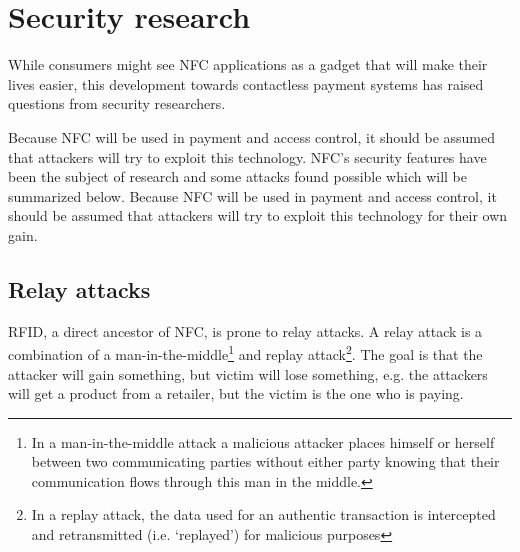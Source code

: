 \section{Security research}
\label{sec:known_vulnerabilities}

While consumers might see NFC applications as a gadget that will make their lives easier, this development towards contactless payment systems has raised questions from security researchers.

Because NFC will be used in payment and access control, it should be assumed that attackers will try to exploit this technology.
NFC's security features have been the subject of research and some attacks found possible which will be summarized below.
Because NFC will be used in payment and access control, it should be assumed that attackers will try to exploit this technology for their own gain. 


\subsection{Relay attacks}
RFID, a direct ancestor of NFC, is prone to relay attacks.
A relay attack is a combination of a man-in-the-middle\footnote{In a man-in-the-middle attack a malicious attacker places himself or herself between two communicating parties without either party knowing that their communication flows through this man in the middle.} and replay attack\footnote{In a replay attack, the data used for an authentic transaction is intercepted and retransmitted (i.e. `replayed') for malicious purposes}.
The goal is that the attacker will gain something, but victim will lose something, e.g. the attackers will get a product from a retailer, but the victim is the one who is paying. 

